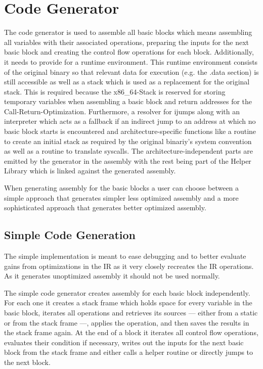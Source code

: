 \documentclass[course=eragp]{aspdoc}
\begin{document}
\section{Code Generator}\label{sec:generator}
The code generator is used to assemble all basic blocks which means assembling all variables with their associated operations,
preparing the inputs for the next basic block and creating the control flow operations for each block.
Additionally, it needs to provide for a runtime environment.
This runtime environment consists of the original binary so that relevant data for execution (e.g. the .data section) is still accessible
as well as a stack which is used as a replacement for the original stack.
This is required because the x86\_64-Stack is reserved for storing temporary variables when assembling a basic block and return addresses for the Call-Return-Optimization.
Furthermore, a resolver for ijumps along with an interpreter which acts as a fallback if an indirect jump to an address at which no basic block starts is encountered
and architecture-specific functions like a routine to create an initial stack as required by the original binariy's system convention as well as a routine to translate syscalls.
The architecture-independent parts are emitted by the generator in the assembly with the rest being part of the Helper Library which is linked against the generated assembly.

\par

When generating assembly for the basic blocks a user can choose between a simple approach that generates simpler less optimized assembly
and a more sophisticated approach that generates better optimized assembly.
\subsection{Simple Code Generation}\label{naive_generator}
The simple implementation is meant to ease debugging
and to better evaluate gains from
optimizations in the IR as it very closely recreates the IR operations.
As it generates unoptimized assembly it should not be used normally.

\par

The simple code generator creates assembly for each basic block independently.
For each one it creates a stack frame which holds space for every variable in the basic block, iterates all operations and
retrieves its sources  --- either from a static or from the stack frame  ---, applies the operation, and then saves the results in the stack frame again.
At the end of a block it iterates all control flow operations, evaluates their condition if necessary, writes out the inputs for the next basic block
from the stack frame and either calls a helper routine or directly jumps to the next block.
\end{document}
